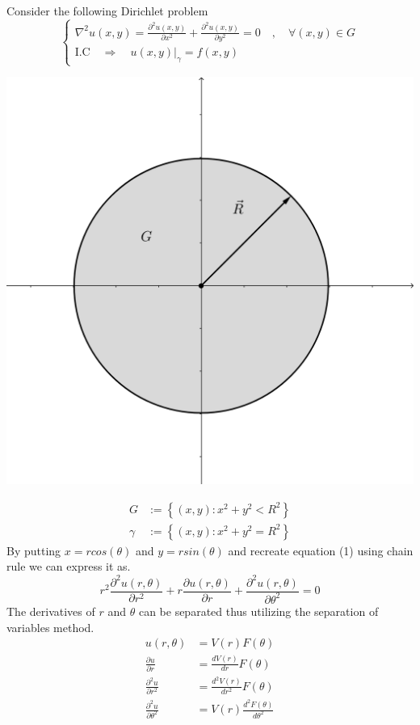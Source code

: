 \documentclass[]{article}
\begin{document}
Consider the following Dirichlet problem
\begin{equation}
    \begin{cases}
        \displaystyle \nabla^2 u(x,y) = \frac{\partial^2 u(x,y)}{\partial x^2} + \frac{\partial^2 u(x,y)}{\partial y^2} = 0 \quad,\quad \forall (x,y) \in G
        \\
        \text{I.C} \quad \Longrightarrow \quad u(x,y)|_\gamma = f(x,y)
    \end{cases}
\end{equation}
\begin{center}
\includegraphics[scale=0.14]{circle.png}
\end{center}
\begin{align*}
G &:= \left\lbrace (x,y):x^2+y^2 < R^2 \right\rbrace
\\
\gamma &:= \left\lbrace (x,y):x^2+y^2 = R^2 \right\rbrace
\end{align*}
By putting $x = r cos(\theta)$ and $y = r sin(\theta)$ and recreate equation (1) using chain rule we can express it as.
\[
    r^2 \frac{\partial^2 u(r,\theta)}{\partial r^2} + r \frac{\partial u(r,\theta)}{\partial r} + \frac{\partial^2 u(r,\theta)}{\partial \theta^2} = 0    
\]
The derivatives of $r$ and $\theta$ can be separated thus utilizing the separation of variables method.
\begin{align*}
u(r,\theta) &= V(r)F(\theta)
\\
\frac{\partial u}{\partial r} &= \frac{d V(r)}{dr}F(\theta)
\\
\frac{\partial^2 u}{\partial r^2} &= \frac{d^2 V(r)}{dr^2}F(\theta)
\\
\frac{\partial^2 u}{\partial \theta^2} &= V(r)\frac{d^2 F(\theta)}{d\theta^2}
\end{align*}
\end{document}
